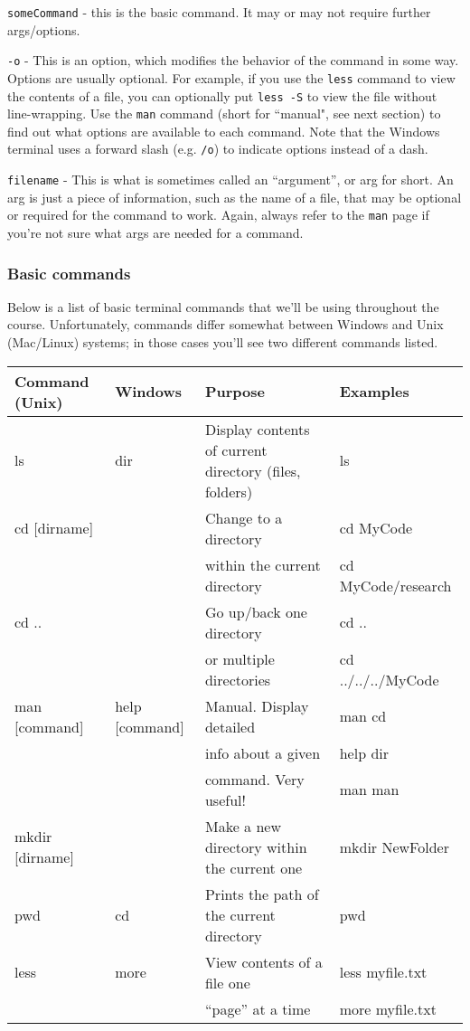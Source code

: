 \documentclass[english,12pt]{article}
\begin{document}
\texttt{someCommand} - this is the basic command. It may or may not require further args/options. 

\texttt{-o} - This is an option, which modifies the behavior of the command in some way. Options are usually optional. For example, if you use the \texttt{less} command to view the contents of a file, you can optionally put \texttt{less -S} to view the file without line-wrapping. Use the \texttt{man} command (short for ``manual", see next section) to find out what options are available to each command. Note that the Windows terminal uses a forward slash (e.g. \texttt{/o}) to indicate options instead of a dash.

\texttt{filename} - This is what is sometimes called an ``argument'', or arg for short. An arg is just a piece of information, such as the name of a file, that may be optional or required for the command to work. Again, always refer to the \texttt{man} page if you're not sure what args are needed for a command. 


\subsubsection*{Basic commands}
Below is a list of basic terminal commands that we'll be using throughout the course. Unfortunately, commands differ somewhat between Windows and Unix (Mac/Linux) systems; in those cases you'll see two different commands listed. 
\\

\begin{tabular}{l | l | p{5cm} | p{5cm}}
	Command (Unix) & Windows & Purpose & Examples \\ \hline
	ls & dir & Display contents of current directory (files, folders) & ls \\ \hline
	cd [dirname] &  & Change to a directory & cd MyCode \\ 
	 & & within the current directory & cd MyCode/research \\ \hline
	cd .. & & Go up/back one directory & cd .. \\
	 & & or multiple directories & cd ../../../MyCode \\ \hline
	man [command] & help [command] & Manual. Display detailed & man cd \\
	 & & info about a given & help dir \\
	 & & command. Very useful! & man man \\ \hline
	mkdir [dirname] & & Make a new directory within the current one & mkdir NewFolder \\ \hline
	pwd & cd & Prints the path of the current directory & pwd \\ \hline
	less & more & View contents of a file one & less myfile.txt\\
	 & & ``page'' at a time & more myfile.txt \\ \hline
	
	
\end{tabular}
\\
\end{document}
